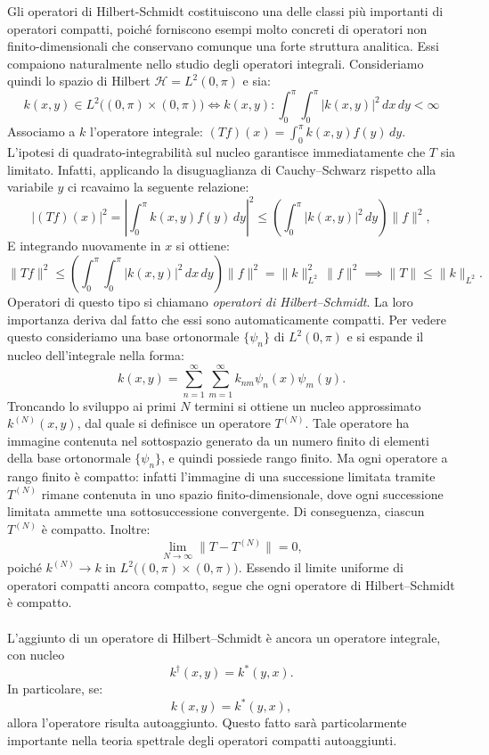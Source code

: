 \documentclass[a4paper,12pt]{report}
\begin{document}
Gli operatori di Hilbert-Schmidt costituiscono una delle classi più importanti di operatori compatti, poiché forniscono esempi molto concreti di operatori non finito-dimensionali che conservano comunque una forte struttura analitica. Essi compaiono naturalmente nello studio degli operatori integrali. Consideriamo quindi lo spazio di Hilbert \(\mathscr{H}=L^2(0,\pi)\) e sia:
\[
k(x,y)\in L^2\big((0,\pi)\times(0,\pi)\big)\iff k(x,y):
\int_0^\pi\int_0^\pi |k(x,y)|^2\,dx\,dy<\infty 
\]
Associamo a \(k\) l’operatore integrale: $(Tf)(x)=\int_0^\pi k(x,y)f(y)\,dy$.
\\L’ipotesi di quadrato-integrabilità sul nucleo garantisce immediatamente che \(T\) sia limitato. Infatti, applicando la disuguaglianza di Cauchy--Schwarz rispetto alla variabile \(y\) ci rcavaimo la seguente relazione:
\[
|(Tf)(x)|^2
=
\left|\int_0^\pi k(x,y)f(y)\,dy\right|^2
\leq
\left(\int_0^\pi |k(x,y)|^2\,dy\right)\|f\|^2,
\]
E integrando nuovamente in \(x\) si ottiene:
\[
\|Tf\|^2
\leq
\left(\int_0^\pi\int_0^\pi |k(x,y)|^2\,dx\,dy\right)\|f\|^2
=
\|k\|_{L^2}^2\,\|f\|^2\implies \|T\|\leq \|k\|_{L^2}.
\]
Operatori di questo tipo si chiamano \emph{operatori di Hilbert--Schmidt}. La loro importanza deriva dal fatto che essi sono automaticamente compatti. Per vedere questo consideriamo una base ortonormale \(\{\psi_n\}\) di \(L^2(0,\pi)\) e si espande il nucleo dell'integrale nella forma:
\[
k(x,y)=\sum_{n=1}^\infty \sum_{m=1}^\infty k_{nm}\psi_n(x)\psi_m(y).
\]
Troncando lo sviluppo ai primi \(N\) termini si ottiene un nucleo approssimato \(k^{(N)}(x,y)\), dal quale si definisce un operatore \(T^{(N)}\). Tale operatore ha immagine contenuta nel sottospazio generato da un numero finito di elementi della base ortonormale \(\{\psi_n\}\), e quindi possiede rango finito. Ma ogni operatore a rango finito è compatto: infatti l’immagine di una successione limitata tramite \(T^{(N)}\) rimane contenuta in uno spazio finito-dimensionale, dove ogni successione limitata ammette una sottosuccessione convergente. Di conseguenza, ciascun \(T^{(N)}\) è compatto. Inoltre:
\[
\lim_{N\to\infty}\|T-T^{(N)}\|= 0,
\]
poiché \(k^{(N)}\to k\) in \(L^2\big((0,\pi)\times(0,\pi)\big)\). Essendo il limite uniforme di operatori compatti ancora compatto, segue che ogni operatore di Hilbert--Schmidt è compatto.
\\
\\L’aggiunto di un operatore di Hilbert--Schmidt è ancora un operatore integrale, con nucleo
\[
k^\dagger(x,y)=k^*(y,x).
\]
In particolare, se:
\[
k(x,y)=k^*(y,x),
\]
allora l’operatore risulta autoaggiunto. Questo fatto sarà particolarmente importante nella teoria spettrale degli operatori compatti autoaggiunti.
\end{document}
